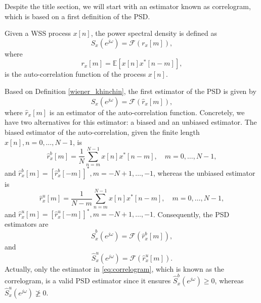 Despite the title section, we will start with an estimator known as correlogram, which is based on a first definition of the PSD.
\begin{definition}
	\label{wiener_khinchin}
	Given a WSS process $x[n]$, the power spectral density is defined as
	\begin{equation*}
	S_x(e^{j \omega}) = \mathcal{F}(r_{x}[m]),
	\end{equation*}
	where
	\begin{equation*}
	r_{x}[m] = \mathbb{E}[x[n] x^{\ast}[n-m]],
	\end{equation*}
	is the auto-correlation function of the process $x[n]$.
\end{definition}

Based on Definition \ref{wiener_khinchin}, the first estimator of the PSD is given by
\begin{equation*}
	\hat{S}_x(e^{j \omega}) = \mathcal{F}(\hat{r}_{x}[m]),
\end{equation*}
where $\hat{r}_{x}[m]$ is an estimator of the auto-correlation function. Concretely, we have two alternatives for this estimator: a biased and an unbiased estimator. The biased estimator of the auto-correlation, given the finite length $x[n], n = 0, \ldots, N-1$, is
\begin{equation}
	\label{eq:autocorrelation_biased}
	\hat{r}_{x}^{b}[m] = \frac{1}{N} \sum_{n = m}^{N-1} x[n] x^{\ast}[n-m], \quad m = 0, \ldots, N-1,
\end{equation}
and $\hat{r}_{x}^{b}[m] = \left[ \hat{r}_{x}^{b}[-m] \right]^{\ast}, m = -N+1, \ldots, -1$, whereas the unbiased estimator is
\begin{equation}
	\label{eq:autocorrelation_unbiased}
\hat{r}_{x}^{u}[m] = \frac{1}{N-m} \sum_{n = m}^{N-1} x[n] x^{\ast}[n-m], \quad m = 0, \ldots, N-1,
\end{equation}
and $\hat{r}_{x}^{u}[m] = \left[ \hat{r}_{x}^{u}[-m] \right]^{\ast}, m = -N+1, \ldots, -1$. Consequently, the PSD estimators are
\begin{equation}
\label{eq:correlogram}
\hat{S}_x^{b}(e^{j \omega}) = \mathcal{F}(\hat{r}_{x}^{b}[m]),
\end{equation}
and
\begin{equation*}
\hat{S}_x^{u}(e^{j \omega}) = \mathcal{F}(\hat{r}_{x}^{u}[m]).
\end{equation*}
Actually, only the estimator in \eqref{eq:correlogram}, which is known as the correlogram, is a valid PSD estimator since it ensures $\hat{S}_x^{b}(e^{j \omega}) \geq 0$, whereas $\hat{S}_x^{u}(e^{j \omega}) \not \geq 0$.

